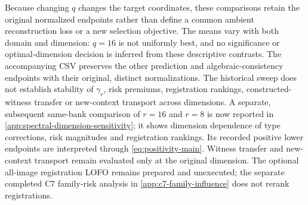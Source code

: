 Because changing $q$ changes the target coordinates, these comparisons retain the original normalized endpoints rather than define a common ambient reconstruction loss or a new selection objective. The means vary with both domain and dimension: $q=16$ is not uniformly best, and no significance or optimal-dimension decision is inferred from these descriptive contrasts. The accompanying CSV preserves the other prediction and algebraic-consistency endpoints with their original, distinct normalizations. The historical sweep does not establish stability of $\gamma_r$, risk premiums, registration rankings, constructed-witness transfer or new-context transport across dimensions. A separate, subsequent same-bank comparison of $r=16$ and $r=8$ is now reported in \cref{app:spectral-dimension-sensitivity}; it shows dimension dependence of type corrections, risk magnitudes and registration rankings. Its recorded positive lower endpoints are interpreted through \cref{eq:positivity-main}. Witness transfer and new-context transport remain evaluated only at the original dimension. The optional all-image registration LOFO remains prepared and unexecuted; the separate completed C7 family-risk analysis in \cref{app:c7-family-influence} does not rerank registrations.
